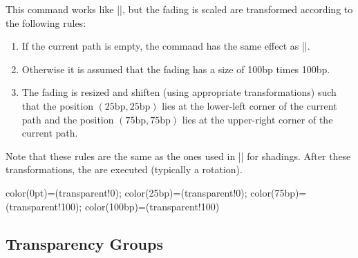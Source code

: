 \begin{command}{\pgfsetfadingforcurrentpath{}}
  This command works like |\pgfsetfading|, but the fading is scaled
  are transformed according to the following rules:
  \begin{enumerate}
  \item
    If the current path is empty, the command has the same effect as
    |\pgfsetfading|. 
  \item
    Otherwise it is assumed that the fading has a size of 100bp times
    100bp. 
  \item
    The fading is resized and shiften (using appropriate
    transformations) such that the position
    $(25\mathrm{bp},25\mathrm{bp})$ lies at the lower-left corner of
    the current path and the position $(75\mathrm{bp},75\mathrm{bp})$
    lies at the upper-right corner of the current path.
  \end{enumerate}
  Note that these rules are the same as the ones used in
  |\pgfshadepath| for shadings. After these transformations, the
   are executed (typically a rotation).
\begin{codeexample}[]
{ color(0pt)=(transparent!0);    color(25bp)=(transparent!0);
  color(75bp)=(transparent!100); color(100bp)=(transparent!100)}


\end{codeexample}

\end{command}

\subsection{Transparency Groups}

